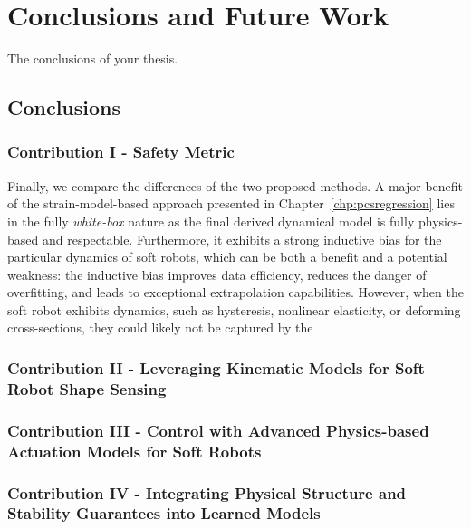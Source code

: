 \chapter{Conclusions and Future Work}
\label{chp:conclusion}

The conclusions of your thesis.

\section{Conclusions}\label{sec:conclusions}

\subsection{Contribution I - Safety Metric}

Finally, we compare the differences of the two proposed methods. A major benefit of the strain-model-based approach presented in Chapter~\ref{chp:pcsregression} lies in the fully \emph{white-box} nature as the final derived dynamical model is fully physics-based and respectable. Furthermore, it exhibits a strong inductive bias for the particular dynamics of soft robots, which can be both a benefit and a potential weakness: the inductive bias improves data efficiency, reduces the danger of overfitting, and leads to exceptional extrapolation capabilities. However, when the soft robot exhibits dynamics, such as hysteresis, nonlinear elasticity, or deforming cross-sections, they could likely not be captured by the 

\subsection{Contribution II - Leveraging Kinematic Models for Soft Robot Shape Sensing}

\subsection{Contribution III - Control with Advanced Physics-based Actuation Models for Soft Robots}

\subsection{Contribution IV - Integrating Physical Structure and Stability Guarantees into Learned Models}

